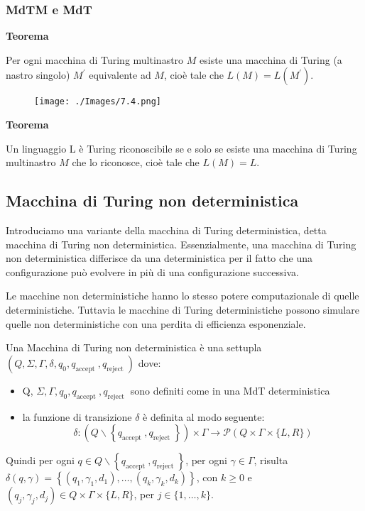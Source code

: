 \subsubsection{MdTM e MdT}

\textbf{Teorema}

Per ogni macchina di Turing multinastro $M$ esiste una macchina di Turing (a nastro singolo) $M^{\prime}$ equivalente ad $M$, cioè tale che $L(M)=L\left(M^{\prime}\right) .$

\begin{figure}[hbpt!]
    \centering
    \texttt{[image: ./Images/7.4.png]}
\end{figure}
\FloatBarrier

\textbf{Teorema}

Un linguaggio L è Turing riconoscibile se e solo se esiste una macchina di Turing multinastro $M$ che lo riconosce, cioè tale che $L(M)=L .$

\subsection{Macchina di Turing non deterministica}

Introduciamo una variante della macchina di Turing deterministica, detta macchina di Turing non deterministica. Essenzialmente, una macchina di Turing non deterministica differisce da una deterministica per il fatto che una configurazione può evolvere in più di una configurazione successiva.

Le macchine non deterministiche hanno lo stesso potere computazionale di quelle deterministiche.
Tuttavia le macchine di Turing deterministiche possono simulare quelle non deterministiche con una perdita di efficienza esponenziale.

\vspace{5mm}

Una Macchina di Turing non deterministica è una settupla $\left(Q, \Sigma, \Gamma, \delta, q_{0}, q_{\text {accept }}, q_{\text {reject }}\right)$ dove:
\begin{itemize}
    \item Q, $\Sigma, \Gamma, q_{0}, q_{\text {accept }}, q_{\text {reject }}$ sono definiti come in una MdT deterministica
    \item la funzione di transizione $\delta$ è definita al modo seguente:
    $$
\delta:\left(Q \backslash\left\{q_{\text {accept }}, q_{\text {reject }}\right\}\right) \times \Gamma \rightarrow \mathcal{P}(Q \times \Gamma \times\{L, R\})
$$
\end{itemize}
Quindi per ogni $q \in Q \backslash\left\{q_{\text {accept }}, q_{\text {reject }}\right\}$, per ogni $\gamma \in \Gamma$, risulta $\delta(q, \gamma)=\left\{\left(q_{1}, \gamma_{1}, d_{1}\right), \ldots,\left(q_{k}, \gamma_{k}, d_{k}\right)\right\}$, con $k \geq 0$ e $\left(q_{j}, \gamma_{j}, d_{j}\right) \in Q \times \Gamma \times\{L, R\}$, per $j \in\{1, \ldots, k\} .$

